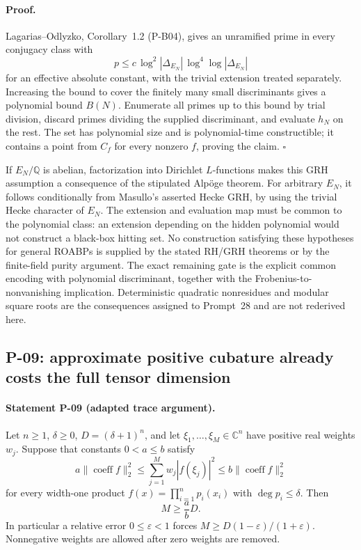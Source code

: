 \paragraph{Proof.}
Lagarias--Odlyzko, Corollary~1.2 (P-B04), gives an unramified prime in every conjugacy class with
\[
 p\le c\,\log^2|\Delta_{E_N}|\,\log^4\log|\Delta_{E_N}|
\]
for an effective absolute constant, with the trivial extension treated separately. Increasing the bound to cover the finitely many small discriminants gives a polynomial bound $B(N)$. Enumerate all primes up to this bound by trial division, discard primes dividing the supplied discriminant, and evaluate $h_N$ on the rest. The set has polynomial size and is polynomial-time constructible; it contains a point from $C_f$ for every nonzero $f$, proving the claim. $\square$

If $E_N/\mathbb Q$ is abelian, factorization into Dirichlet $L$-functions makes this GRH assumption a consequence of the stipulated Alp\"oge theorem. For arbitrary $E_N$, it follows conditionally from Masullo's asserted Hecke GRH, by using the trivial Hecke character of $E_N$. The extension and evaluation map must be common to the polynomial class: an extension depending on the hidden polynomial would not construct a black-box hitting set. No construction satisfying these hypotheses for general ROABPs is supplied by the stated RH/GRH theorems or by the finite-field purity argument. The exact remaining gate is the explicit common encoding with polynomial discriminant, together with the Frobenius-to-nonvanishing implication. Deterministic quadratic nonresidues and modular square roots are the consequences assigned to Prompt~28 and are not rederived here.

\subsection{P-09: approximate positive cubature already costs the full tensor dimension}
\paragraph{Statement P-09 (adapted trace argument).}
Let $n\ge1$, $\delta\ge0$, $D=(\delta+1)^n$, and let $\xi_1,\ldots,\xi_M\in\mathbb C^n$ have positive real weights $w_j$. Suppose that constants $0<a\le b$ satisfy
\[
 a\|\operatorname{coeff} f\|_2^2
 \le \sum_{j=1}^M w_j|f(\xi_j)|^2
 \le b\|\operatorname{coeff} f\|_2^2
 \tag{P09.1}
\]
for every width-one product $f(x)=\prod_{i=1}^n p_i(x_i)$ with $\deg p_i\le\delta$. Then
\[
 M\ge \frac{a}{b}D.
 \tag{P09.2}
\]
In particular a relative error $0\le\varepsilon<1$ forces
$M\ge D(1-\varepsilon)/(1+\varepsilon)$. Nonnegative weights are allowed after zero weights are removed.
